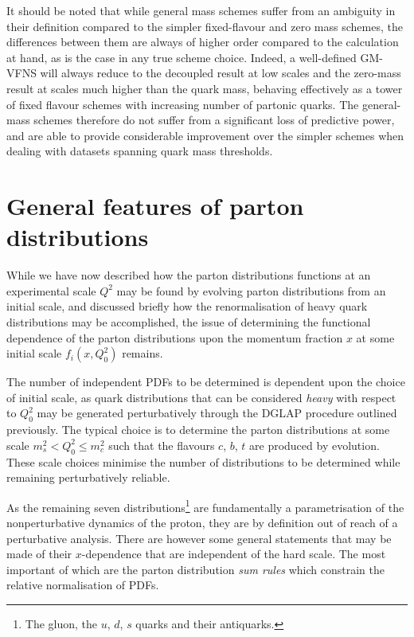 It should be noted that while general mass schemes suffer from an ambiguity in their definition compared to the simpler fixed-flavour and zero mass schemes, the differences between them are always of higher order compared to the calculation at hand, as is the case in any true scheme choice. Indeed, a well-defined GM-VFNS will always reduce to the decoupled result at low scales and the zero-mass result at scales much higher than the quark mass, behaving effectively as a tower of fixed flavour schemes with increasing number of partonic quarks. The general-mass schemes therefore do not suffer from a significant loss of predictive power, and are able to provide considerable improvement over the simpler schemes when dealing with datasets spanning quark mass thresholds.

\section{General features of parton distributions}

While we have now described how the parton distributions functions at an experimental scale $Q^2$ may be found by evolving parton distributions from an initial scale, and discussed briefly how the renormalisation of heavy quark distributions may be accomplished, the issue of determining the functional dependence of the parton distributions upon the momentum fraction $x$ at some initial scale $f_i(x,Q_0^2)$ remains. 

The number of independent PDFs to be determined is dependent upon the choice of initial scale, as quark distributions that can be considered \emph{heavy} with respect to $Q^2_0$ may be generated perturbatively through the DGLAP procedure outlined previously. The typical choice is to determine the parton distributions at some scale $ m_s^2< Q^2_0 \le m_c^2$ such that the flavours $c$, $b$, $t$ are produced by evolution. These scale choices minimise the number of distributions to be determined while remaining perturbatively reliable.

As the remaining seven distributions\footnote{The gluon, the $u$, $d$, $s$ quarks and their antiquarks.} are fundamentally a parametrisation of the nonperturbative dynamics of the proton, they are by definition out of reach of a perturbative analysis. There are however some general statements that may be made of their $x$-dependence that are independent of the hard scale. The most important of which are the parton distribution \emph{sum rules} which constrain the relative normalisation of PDFs.

